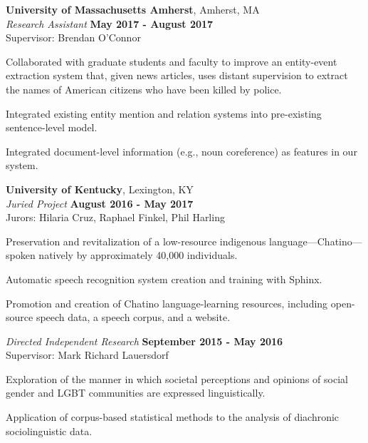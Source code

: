 \documentclass[10pt]{article}
\newcommand{\halfblankline}{\quad\vspace{-0.5\baselineskip}\pagebreak[3]}
\begin{document}
	\halfblankline

	{\textbf{University of Massachusetts Amherst}},
	Amherst, MA\\
		\textit{Research Assistant}%
		\hfill \textbf{May 2017 - August 2017}\\
		Supervisor: Brendan O'Connor
		\begin{innerlist}
			\item Collaborated with graduate students and faculty to improve an entity-event extraction system that, given
news articles, uses distant supervision to extract the names of American citizens who have been killed by police.
			\item Integrated existing entity mention and relation systems into pre-existing sentence-level model.
			\item Integrated document-level information (e.g., noun coreference) as features in our system.
		\end{innerlist}
	
	\halfblankline
	
	{\textbf{University of Kentucky}},
	Lexington, KY\\
		\textit{Juried Project}%
		\hfill \textbf{August 2016 - May 2017}\\
		Jurors: Hilaria Cruz, Raphael Finkel, Phil Harling
		\begin{innerlist}
			\item Preservation and revitalization of a low-resource indigenous language---Chatino---spoken natively by approximately 40,000 individuals.
			\item Automatic speech recognition system creation and training with Sphinx.
			\item Promotion and creation of Chatino language-learning resources, including open-source speech data, a speech corpus, and a website.
		\end{innerlist}
	
	\halfblankline
	
		\textit{Directed Independent Research}
		\hfill \textbf{September 2015 - May 2016}\\
		Supervisor: Mark Richard Lauersdorf
		\begin{innerlist}
			\item Exploration of the manner in which societal perceptions and opinions of social gender and LGBT communities are expressed linguistically.
			\item Application of corpus-based statistical methods to the analysis of diachronic sociolinguistic data.
		\end{innerlist}
	
\end{document}
